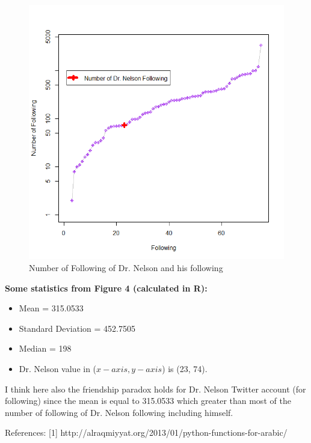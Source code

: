 \documentclass[12pt,letterpaper]{article}
\begin{document}
\begin{figure}[ht!]
\centering
\includegraphics[scale=0.55]{twitter2}
\caption{Number of Following of Dr. Nelson and his following }
\label{overflow}
\end{figure}

{\bf Some statistics from Figure 4 (calculated in R):}
\begin{itemize}
\item Mean =  315.0533
\item Standard Deviation = 452.7505
\item Median = 198
\item Dr. Nelson value in ($x-axis, y-axis$) is (23, 74). 
\end{itemize}

I think here also the friendship paradox holds for Dr. Nelson Twitter account (for following) since the mean is equal to 315.0533 which greater than most of the number of following of Dr. Nelson following including himself. 


References:
[1] http://alraqmiyyat.org/2013/01/python-functions-for-arabic/
\end{document}
